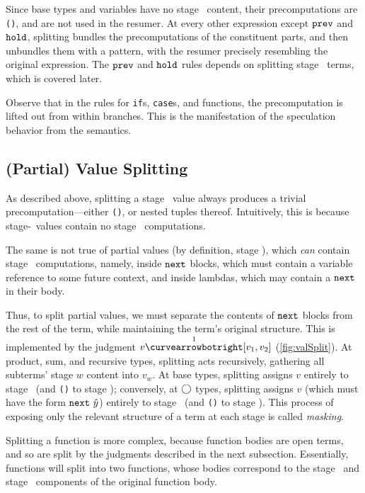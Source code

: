 Since base types and variables have no stage \bbone\ content, their
precomputations are \texttt{()}, and are not used in the resumer. At every other
expression except ${\tt prev}$ and ${\tt hold}$, splitting bundles the precomputations of the
constituent parts, and then unbundles them with a pattern, with the resumer
precisely resembling the original expression. The ${\tt prev}$ and ${\tt hold}$ rules depends on
splitting stage \bbone\ terms, which is covered later.

Observe that in the rules for {\tt if}s, {\tt case}s, and functions, the
precomputation is lifted out from within branches. This is the manifestation of
the speculation behavior from the semantics.


\subsection{(Partial) Value Splitting}

As described above, splitting a stage \bbtwo\ value always produces a trivial
precomputation---either \texttt{()}, or nested tuples thereof. Intuitively,
this is because stage-\bbtwo\ values contain no stage \bbone\ computations.

The same is not true of partial values (by definition, stage \bbone), which \emph{can}
contain stage \bbtwo\ computations, namely, inside ${\tt next}$ blocks, which must
contain a variable reference to some future context, and inside lambdas, which
may contain a ${\tt next}$ in their body.

Thus, to split partial values, we must separate the contents of ${\tt next}$ blocks
from the rest of the term, while maintaining the term's original structure. This
is implemented by the judgment $v \vsplito [v_1,v_2]$ (\ref{fig:valSplit}).
At product, sum, and recursive types, splitting acts recursively, gathering all
subterms' stage $w$ content into $v_w$.
At base types, splitting assigns $v$ entirely to stage \bbone\ (and \texttt{()}
to stage \bbtwo);
conversely, at $\bigcirc$ types, splitting assigns $v$ (which must have the
form ${\tt next}~\hat y$) entirely to stage \bbtwo\ (and \texttt{()} to stage
\bbone).
This process of exposing only the relevant structure of a term at each stage is
called \emph{masking}.

Splitting a function is more complex, because function bodies are open terms,
and so are split by the judgments described in the next subsection. Essentially,
functions will split into two functions, whose bodies correspond to the stage
\bbone\ and stage \bbtwo\ components of the original function body.

